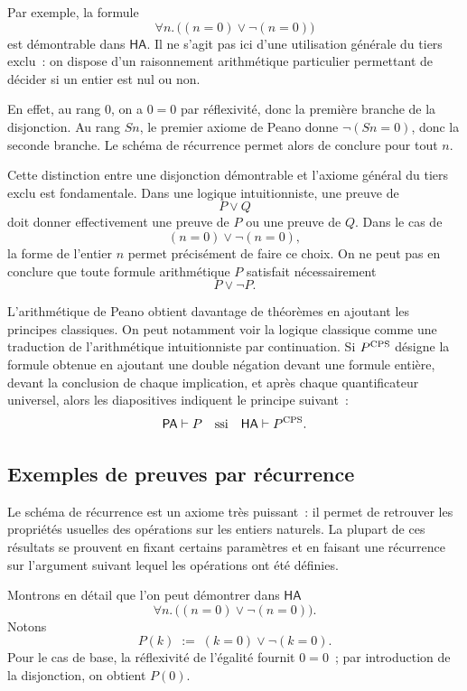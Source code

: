 \thingy
Par exemple, la formule
\[
\forall n.\,\bigl((n=0)\lor\neg(n=0)\bigr)
\]
est démontrable dans $\mathsf{HA}$.  Il ne s'agit pas ici d'une
utilisation générale du tiers exclu : on dispose d'un raisonnement
arithmétique particulier permettant de décider si un entier est nul ou
non.

En effet, au rang $0$, on a $0=0$ par réflexivité, donc la première
branche de la disjonction.  Au rang $Sn$, le premier axiome de Peano
donne $\neg(Sn=0)$, donc la seconde branche.  Le schéma de récurrence
permet alors de conclure pour tout $n$.

\thingy
Cette distinction entre une disjonction démontrable et l'axiome général
du tiers exclu est fondamentale.  Dans une logique intuitionniste, une
preuve de
\[
P\lor Q
\]
doit donner effectivement une preuve de $P$ ou une preuve de $Q$.  Dans
le cas de
\[
(n=0)\lor\neg(n=0),
\]
la forme de l'entier $n$ permet précisément de faire ce choix.  On ne
peut pas en conclure que toute formule arithmétique $P$ satisfait
nécessairement
\[
P\lor\neg P.
\]

\thingy
L'arithmétique de Peano obtient davantage de théorèmes en ajoutant les
principes classiques.  On peut notamment voir la logique classique comme
une traduction de l'arithmétique intuitionniste par continuation.  Si
$P^{\mathrm{CPS}}$ désigne la formule obtenue en ajoutant une double négation
devant une formule entière, devant la conclusion de chaque implication,
et après chaque quantificateur universel, alors les diapositives
indiquent le principe suivant :
\[
\mathsf{PA}\vdash P
\quad\text{ssi}\quad
\mathsf{HA}\vdash P^{\mathrm{CPS}}.
\]


\subsection{Exemples de preuves par récurrence}

\thingy
Le schéma de récurrence est un axiome très puissant : il permet de
retrouver les propriétés usuelles des opérations sur les entiers
naturels.  La plupart de ces résultats se prouvent en fixant certains
paramètres et en faisant une récurrence sur l'argument suivant lequel les
opérations ont été définies.

\thingy
Montrons en détail que l'on peut démontrer dans $\mathsf{HA}$
\[
\forall n.\,\bigl((n=0)\lor\neg(n=0)\bigr).
\]
Notons
\[
P(k)\;:=\;(k=0)\lor\neg(k=0).
\]
Pour le cas de base, la réflexivité de l'égalité fournit $0=0$ ; par
introduction de la disjonction, on obtient $P(0)$.

